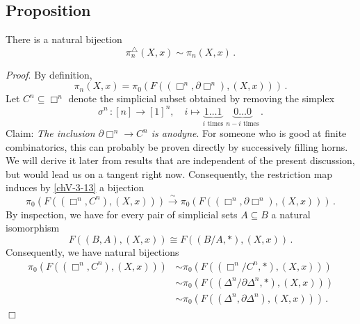     \subsection{Proposition}\label{chV-3-14}
        There is a natural bijection
        \begin{equation*}
            \pi^{\triangle}_n(X, x) \sim \pi_n(X, x) \,.
        \end{equation*}
        \smallskip

        \emph{Proof}. By definition,
        \begin{equation*}
            \pi_n(X, x) = \pi_0(F((\Box^n, \partial \Box^n),(X, x))) \,.
        \end{equation*}
        Let $C^n \subseteq \Box^n$ denote the simplicial subset obtained by removing the simplex
        \begin{equation*}
            \sigma^n \,\colon [n] \to [1]^n, \quad i \mapsto \underbrace{1 \ldots 1}_{i \text{ times}} \; \underbrace{0 \ldots 0}_{n-i \text{ times}} \,.
        \end{equation*}
        Claim: \emph{The inclusion $\partial \Box^n \to C^n$ is anodyne}. For someone who is good at finite combinatorics, this can probably be proven directly by successively filling horns. We will derive it later from results that are independent of the present discussion, but would lead us on a tangent right now.
        Consequently, the restriction map induces by \ref{chV-3-13} a bijection
        \begin{equation*}
            \pi_0(F((\Box^n, C^n),(X, x))) \xrightarrow{\sim} \pi_0(F((\Box^n, \partial \Box^n),(X, x))) \,.
        \end{equation*}
        By inspection, we have for every pair of simplicial sets $A \subseteq B$ a natural isomorphism
        \begin{equation*}
            F((B, A), (X, x)) \cong F((B/A, *), (X, x)) \,.
        \end{equation*}
        Consequently, we have natural bijections
        \begin{align*}
            \pi_0(F((\Box^n, C^n),(X, x))) &\sim \pi_0(F((\Box^n/C^n, *),(X, x))) \\
                                 &\sim \pi_0(F((\Delta^n/\partial \Delta^n, *),(X, x))) \\
                                 &\sim \pi_0(F((\Delta^n, \partial \Delta^n),(X, x))) \,.
        \end{align*}
        \hfill$\Box$

